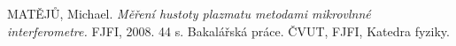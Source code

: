 \documentclass[portrait,final,a0paper]{baposter}
\begin{document}
\begin{poster}

{
 MATĚJŮ, Michael. {\em Měření hustoty plazmatu metodami mikrovlnné interferometre.} FJFI, 2008. 44 s. Bakalářská práce. ČVUT, FJFI, Katedra fyziky.
 
}

\end{poster}
\end{document}
